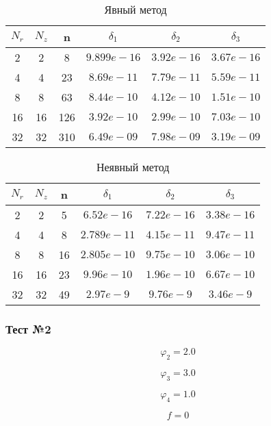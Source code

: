 \begin{table}[H]
\begin{center}
  \begin{tabular}{*{6}c}
    \toprule
    $ N_r $ & $ N_z $ & n & $ \delta_1 $ & $ \delta_2 $ & $ \delta_3 $ \\
    \midrule
    2 & 2 & 8 & $9.899e-16 $ & $3.92e-16 $ & $3.67e-16 $ \\
    4 & 4 & 23 & $8.69e-11 $ & $7.79e-11 $ & $5.59e-11 $ \\
    8 & 8 & 63 & $8.44e-10 $ & $4.12e-10 $ & $1.51e-10 $ \\
    16 & 16 & 126 & $3.92e-10 $ & $2.99e-10 $ & $7.03e-10 $ \\
    32 & 32 & 310 & $6.49e-09 $ & $7.98e-09 $ & $3.19e-09 $ \\
    \bottomrule
  \end{tabular}
  \caption{Явный метод}
\end{center}
\end{table}

\begin{table}[H]
  \begin{center}
    \begin{tabular}{*{6}c}
      \toprule
      $ N_r $ & $ N_z $ & n & $ \delta_1 $ & $ \delta_2 $ & $ \delta_3 $ \\
      \midrule
      2 & 2 & 5 & $6.52e-16 $ & $7.22e-16 $ & $3.38e-16 $ \\
      4 & 4 & 8 & $2.789e-11 $ & $4.15e-11 $ & $9.47e-11 $ \\
      8 & 8 & 16 & $2.805e-10 $ & $9.75e-10 $ & $3.06e-10 $ \\
      16 & 16 & 23 & $9.96e-10$ & $1.96e-10 $ & $6.67e-10 $ \\
      32 & 32 & 49 & $2.97e-9 $ & $9.76e-9 $ & $3.46e-9 $ \\
      \bottomrule
    \end{tabular}
    \caption{Неявный метод}
  \end{center}
\end{table}

\subsubsection*{Тест №2}

\[
 \varphi_2 = 2.0
\]

\[
 \varphi_3 = 3.0
\]

\[
 \varphi_4 = 1.0
\]

\[
  f = 0
\]


